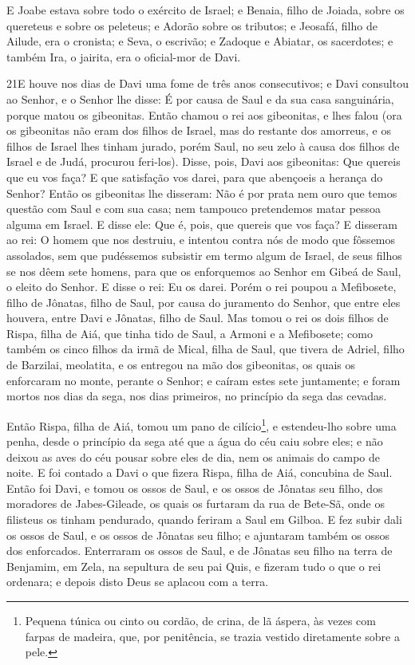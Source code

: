 E Joabe estava sobre todo o exército de Israel; e Benaia, filho
de Joiada, sobre os quereteus e sobre os peleteus; e Adorão
sobre os tributos; e Jeosafá, filho de Ailude, era o cronista;
e Seva, o escrivão; e Zadoque e Abiatar, os sacerdotes;
e também Ira, o jairita, era o oficial-mor de Davi.

\medskip

\lettrine{21} E houve nos dias de Davi uma fome de três anos
consecutivos; e Davi consultou ao Senhor, e o Senhor lhe disse: É
por causa de Saul e da sua casa sanguinária, porque matou os
gibeonitas. Então chamou o rei aos gibeonitas, e lhes falou (ora
os gibeonitas não eram dos filhos de Israel, mas do restante dos
amorreus, e os filhos de Israel lhes tinham jurado, porém Saul, no
seu zelo à causa dos filhos de Israel e de Judá, procurou feri-los).
Disse, pois, Davi aos gibeonitas: Que quereis que eu vos faça? E
que satisfação vos darei, para que abençoeis a herança do Senhor?
Então os gibeonitas lhe disseram: Não é por prata nem ouro que
temos questão com Saul e com sua casa; nem tampouco pretendemos
matar pessoa alguma em Israel. E disse ele: Que é, pois, que quereis
que vos faça? E disseram ao rei: O homem que nos destruiu, e
intentou contra nós de modo que fôssemos assolados, sem que
pudéssemos subsistir em termo algum de Israel, de seus filhos se
nos dêem sete homens, para que os enforquemos ao Senhor em Gibeá de
Saul, o eleito do Senhor. E disse o rei: Eu os darei. Porém o
rei poupou a Mefibosete, filho de Jônatas, filho de Saul, por causa
do juramento do Senhor, que entre eles houvera, entre Davi e
Jônatas, filho de Saul. Mas tomou o rei os dois filhos de Rispa,
filha de Aiá, que tinha tido de Saul, a Armoni e a Mefibosete; como
também os cinco filhos da irmã de Mical, filha de Saul, que tivera
de Adriel, filho de Barzilai, meolatita, e os entregou na mão
dos gibeonitas, os quais os enforcaram no monte, perante o Senhor; e
caíram estes sete juntamente; e foram mortos nos dias da sega, nos
dias primeiros, no princípio da sega das cevadas.

Então Rispa, filha de Aiá, tomou um pano de
cilício\footnote{Pequena túnica ou cinto ou cordão, de crina, de lã
áspera, às vezes com farpas de madeira, que, por penitência, se
trazia vestido diretamente sobre a pele.}, e estendeu-lho sobre uma
penha, desde o princípio da sega até que a água do céu caiu sobre
eles; e não deixou as aves do céu pousar sobre eles de dia, nem os
animais do campo de noite. E foi contado a Davi o que fizera
Rispa, filha de Aiá, concubina de Saul. Então foi Davi, e
tomou os ossos de Saul, e os ossos de Jônatas seu filho, dos
moradores de Jabes-Gileade, os quais os furtaram da rua de Bete-Sã,
onde os filisteus os tinham pendurado, quando feriram a Saul em
Gilboa. E fez subir dali os ossos de Saul, e os ossos de
Jônatas seu filho; e ajuntaram também os ossos dos enforcados.
Enterraram os ossos de Saul, e de Jônatas seu filho na terra
de Benjamim, em Zela, na sepultura de seu pai Quis, e fizeram tudo o
que o rei ordenara; e depois disto Deus se aplacou com a terra.

